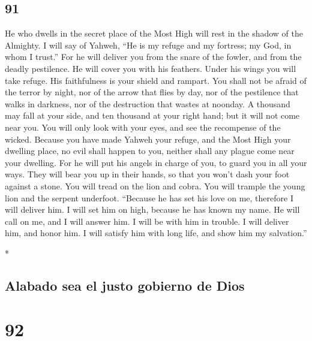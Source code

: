 \begin{paracol}{2}
\begin{otherlanguage}{english}
\hypertarget{section-181}{%
\section{91}\label{section-181}}

 He who dwells in the secret place of the Most High will
rest in the shadow of the Almighty.  I will say of Yahweh,
``He is my refuge and my fortress; my God, in whom I trust.''
 For he will deliver you from the snare of the fowler, and
from the deadly pestilence.  He will cover you with his
feathers. Under his wings you will take refuge. His faithfulness is your
shield and rampart.  You shall not be afraid of the terror
by night, nor of the arrow that flies by day,  nor of the
pestilence that walks in darkness, nor of the destruction that wastes at
noonday.  A thousand may fall at your side, and ten
thousand at your right hand; but it will not come near you.
 You will only look with your eyes, and see the recompense
of the wicked.  Because you have made Yahweh your refuge,
and the Most High your dwelling place,  no evil shall
happen to you, neither shall any plague come near your dwelling.
 For he will put his angels in charge of you, to guard
you in all your ways.  They will bear you up in their
hands, so that you won't dash your foot against a stone. 
You will tread on the lion and cobra. You will trample the young lion
and the serpent underfoot.  ``Because he has set his love
on me, therefore I will deliver him. I will set him on high, because he
has known my name.  He will call on me, and I will answer
him. I will be with him in trouble. I will deliver him, and honor him.
 I will satisfy him with long life, and show him my
salvation.''

\end{otherlanguage}

\switchcolumn[0]*

\hypertarget{alabado-sea-el-justo-gobierno-de-dios}{%
\subsection{Alabado sea el justo gobierno de
Dios}\label{alabado-sea-el-justo-gobierno-de-dios}}

\hypertarget{section-182}{%
\section{92}\label{section-182}}


\end{paracol}
